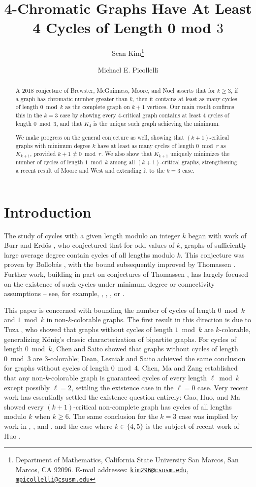 \documentclass[12pt]{article}
\title{4-Chromatic Graphs Have At Least 4 Cycles of Length 0 mod $3$}
\author{Sean Kim\thanks{Department of Mathematics, California State University San Marcos, San Marcos, CA 92096. E-mail addresses: \href{mailto:kim296@csusm.edu}{\tt kim296@csusm.edu}, \href{mailto:mpicollelli@csusm.edu}{\tt mpicollelli@csusm.edu}}  \and Michael E. Picollelli\footnotemark[1]}
\date{}
\numberwithin{theorem}{section}
\begin{document}
\maketitle

\begin{abstract}
A 2018 conjecture of Brewster, McGuinness, Moore, and Noel \cite{BMMN} asserts that for $k \ge 3$, if a graph has chromatic number greater than $k$, then it contains at least as many cycles of length $0 \bmod k$ as the complete graph on $k+1$ vertices. Our main result confirms this in the $k=3$ case by showing every $4$-critical graph contains at least $4$ cycles of length $0 \bmod 3$, and that $K_4$ is the unique such graph achieving the minimum.

We make progress on the general conjecture as well, showing that $(k+1)$-critical graphs with minimum degree $k$ have at least as many cycles of length $0\bmod r$ as $K_{k+1}$, provided $k+1 \ne 0 \bmod r$.  We also show that $K_{k+1}$ uniquely minimizes the number of cycles of length $1\bmod k$ among all $(k+1)$-critical graphs, strengthening a recent result of Moore and West \cite{MW} and extending it to the $k=3$ case.
\end{abstract}

\section{Introduction}


The study of cycles with a given length modulo an integer $k$ began with work of Burr and Erd\H{o}s \cite{Erd}, who conjectured that for odd values of $k$, graphs of sufficiently large average degree contain cycles of all lengths modulo $k$. This conjecture was proven by Bollob\'as \cite{Bol}, with the bound subsequently improved by Thomassen \cite{Thomassen}.  Further work, building in part on conjectures of Thomassen \cite{Thomassen}, has largely focused on the existence of such cycles under minimum degree or connectivity assumptions -- see, for example,  \cite{Dean}, \cite{Diwan}, \cite{GHLM}, or \cite{SV}.

This paper is concerned with bounding the number of cycles of length $0\bmod k$ and $1\bmod k$ in non-$k$-colorable graphs. The first result in this direction is due to Tuza \cite{Tuza}, who showed that graphs without cycles of length $1 \bmod k$ are $k$-colorable, generalizing K\"onig's classic characterization of bipartite graphs. For cycles of length $0\bmod k$, Chen and Saito \cite{ChenSaito} showed that graphs without cycles of length $0\bmod 3$ are $3$-colorable; Dean, Lesniak and Saito \cite{DLS} achieved the same conclusion for graphs without cycles of length $0\bmod 4$. Chen, Ma and Zang \cite{CMZ} established that any non-$k$-colorable graph is guaranteed cycles of every length $\ell \bmod k$ except possibly $\ell=2$, settling the existence case in the $\ell=0$ case.  Very recent work has essentially settled the existence question entirely: Gao, Huo, and Ma \cite{GHM} showed every $(k+1)$-critical non-complete graph has cycles of all lengths modulo $k$ when $k \ge 6$. The same conclusion for the $k=3$ case was implied by work in \cite{ChenSaito}, \cite{LY}, and \cite{Saito}, and the case where $k \in \{4,5\}$ is the subject of recent work of Huo \cite{Huo}.
\end{document}

